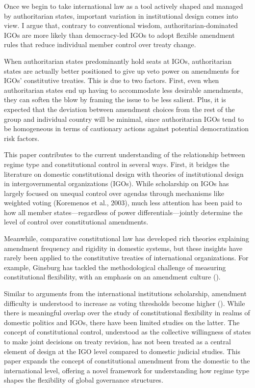 \documentclass[12pt]{article}
\begin{document}
Once we begin to take international law as a tool actively shaped and managed by authoritarian states, important variation in institutional design comes into view. I argue that, contrary to conventional wisdom, authoritarian-dominated IGOs are more likely than democracy-led IGOs to adopt flexible amendment rules that reduce individual member control over treaty change.

When authoritarian states predominantly hold seats at IGOs, authoritarian states are actually better positioned to give up veto power on amendments for IGOs’ constitutive treaties. This is due to two factors. First, even when authoritarian states end up having to accommodate less desirable amendments, they can soften the blow by framing the issue to be less salient. Plus, it is expected that the deviation between amendment choices from the rest of the group and individual country will be minimal, since authoritarian IGOs tend to be homogeneous in terms of cautionary actions against potential democratization risk factors.  

This paper contributes to the current understanding of the relationship between regime type and constitutional control in several ways. First, it bridges the literature on domestic constitutional design with theories of institutional design in intergovernmental organizations (IGOs). While scholarship on IGOs has largely focused on unequal control over agendas through mechanisms like weighted voting ({Koremenos et al., 2003}), much less attention has been paid to how all member states—regardless of power differentials—jointly determine the level of control over constitutional amendments. 

Meanwhile, comparative constitutional law has developed rich theories explaining amendment frequency and rigidity in domestic systems, but these insights have rarely been applied to the constitutive treaties of international organizations. For example, Ginsburg has tackled the methodological challenge of measuring constitutional flexibility, with an emphasis on an amendment culture (\cite{ginsburg2015}). 

Similar to arguments from the international institutions scholarship, amendment difficulty is understood to increase as voting thresholds become higher (\cite{lutz1994, ferejohn1997}). While there is meaningful overlap over the study of constitutional flexibility in realms of domestic politics and IGOs, there have been limited studies on the latter.  The concept of constitutional control, understood as the collective willingness of states to make joint decisions on treaty revision, has not been treated as a central element of design at the IGO level compared to domestic judicial studies. This paper expands the concept of constitutional amendment from the domestic to the international level, offering a novel framework for understanding how regime type shapes the flexibility of global governance structures.  
\end{document}

